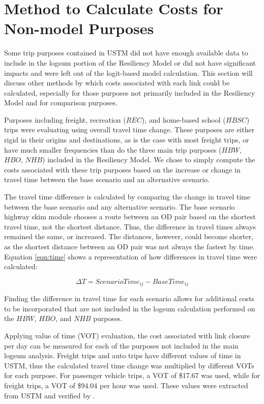 \section{Method to Calculate Costs for Non-model Purposes}

Some trip purposes contained in USTM did not have enough available data to
include in the logsum portion of the Resiliency Model or did not have
significant impacts and were left out of the logit-based model
calculation. This section will discuss other methods by which costs
associated with each link could be calculated, especially for those
purposes not primarily included in the Resiliency Model and for comparison purposes.

Purposes including freight, recreation ($REC$), and home-based school
($HBSC$) trips were evaluating using overall travel time change. These
purposes are either rigid in their origins and destinations, as is the
case with most freight trips, or have much smaller frequencies than do the
three main trip purposes ($HBW$, $HBO$, $NHB$) included in the Resiliency
Model. We chose to simply compute the costs associated with these trip
purposes based on the increase or change in travel time between the base
scenario and an alternative scenario.

The travel time difference is calculated by comparing the change in travel
time between the base scenario and any alternative scenario. The base
scenario highway skim module chooses a route between an OD pair based on
the shortest travel time, not the shortest distance. Thus, the difference
in travel times always remained the same, or increased. The distances, however,
could become shorter, as the shortest distance between an OD pair was not
always the fastest by time. Equation \ref{eqn:time} shows a representation of how
differences in travel time were calculated:

\begin{equation}
	\Delta T = Scenario Time_{ij} - Base Time_{ij}
	\label{eqn:time}
\end{equation}

Finding the difference in travel time for each scenario allows for
additional costs to be incorporated that are not included in the logsum
calculation performed on the $HBW$, $HBO$, and $NHB$ purposes.

Applying value of time (VOT) evaluation, the cost associated with link
closure per day can be measured for each of the purposes not included in
the main logsum analysis. Freight trips and auto trips have different
values of time in USTM, thus the calculated travel time change was
multiplied by different VOTs for each purpose. For passenger vehicle
trips, a VOT of \$17.67 was used, while for freight trips, a VOT of
\$94.04 per hour was used. These values were extracted from USTM and
verified by \cite{UtahDepartmentofTransportation2020}.

